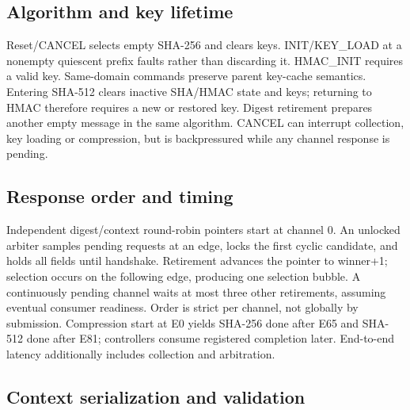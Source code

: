 \documentclass[11pt,a4paper]{article}
\begin{document}
\subsection{Algorithm and key lifetime}

Reset/\allowbreak{}CANCEL selects empty SHA-256 and clears keys. INIT/\allowbreak{}KEY\_\allowbreak{}LOAD at a nonempty quiescent prefix faults rather than discarding it. HMAC\_\allowbreak{}INIT requires a valid key. Same-domain commands preserve parent key-cache semantics. Entering SHA-512 clears inactive SHA/\allowbreak{}HMAC state and keys; returning to HMAC therefore requires a new or restored key. Digest retirement prepares another empty message in the same algorithm. CANCEL can interrupt collection,\allowbreak{} key loading or compression,\allowbreak{} but is backpressured while any channel response is pending.

\subsection{Response order and timing}

Independent digest/\allowbreak{}context round-robin pointers start at channel 0. An unlocked arbiter samples pending requests at an edge,\allowbreak{} locks the first cyclic candidate,\allowbreak{} and holds all fields until handshake. Retirement advances the pointer to winner+\allowbreak{}1; selection occurs on the following edge,\allowbreak{} producing one selection bubble. A continuously pending channel waits at most three other retirements,\allowbreak{} assuming eventual consumer readiness. Order is strict per channel,\allowbreak{} not globally by submission. Compression start at E0 yields SHA-256 done after E65 and SHA-512 done after E81; controllers consume registered completion later. End-to-end latency additionally includes collection and arbitration.

\subsection{Context serialization and validation}
\end{document}
